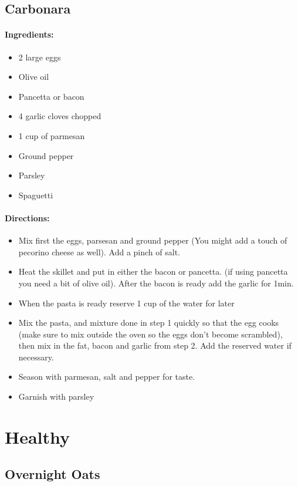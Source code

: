 \documentclass{article}
\begin{document}
\subsection{Carbonara}

\paragraph{Ingredients:}

\begin{itemize}
	\item 2 large eggs
	\item Olive oil
	\item Pancetta or bacon
	\item 4 garlic cloves chopped
	\item 1 cup of parmesan
	\item Ground pepper
	\item Parsley
	\item Spaguetti
\end{itemize}

\paragraph{Directions:}
\begin{itemize}
	\item Mix first the eggs, parsesan and ground pepper (You might add a touch of pecorino cheese as well). Add a pinch of salt.
	\item Heat the skillet and put in either the bacon or pancetta. (if using pancetta you need a bit of olive oil). After the bacon is ready add the garlic for 1min.
	\item When the pasta is ready reserve 1 cup of the water for later
	\item Mix the pasta, and mixture done in step 1 quickly so that the egg cooks (make sure to mix outside the oven so the eggs don’t become scrambled), then mix in the fat, bacon and garlic from step 2. Add the reserved water if necessary.
	\item Season with parmesan, salt and pepper for taste.
	\item Garnish with parsley
\end{itemize}

\section{Healthy}

\subsection{Overnight Oats}
\end{document}
